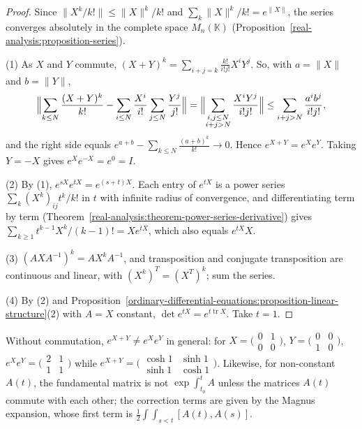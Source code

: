 \begin{proof}
Since $\|X^k/k!\| \leq \|X\|^k/k!$ and $\sum_k\|X\|^k/k! = e^{\|X\|}$, the series converges absolutely in the complete space $M_n(\mathbb{K})$ (Proposition~\ref{real-analysis:proposition-series}).

(1) As $X$ and $Y$ commute, $(X + Y)^k = \sum_{i+j=k}\frac{k!}{i!j!}X^iY^j$. So, with $a = \|X\|$ and $b = \|Y\|$,
\[
\Bigl\|\sum_{k \leq N}\frac{(X + Y)^k}{k!} - \sum_{i \leq N}\frac{X^i}{i!}\sum_{j \leq N}\frac{Y^j}{j!}\Bigr\| = \Bigl\|\sum_{\substack{i, j \leq N\\ i + j > N}}\frac{X^iY^j}{i!j!}\Bigr\|
\leq \sum_{i + j > N}\frac{a^ib^j}{i!j!},
\]
and the right side equals $e^{a+b} - \sum_{k \leq N}\frac{(a + b)^k}{k!} \to 0$. Hence $e^{X+Y} = e^Xe^Y$. Taking $Y = -X$ gives $e^Xe^{-X} = e^0 = I$.

(2) By (1), $e^{sX}e^{tX} = e^{(s+t)X}$. Each entry of $e^{tX}$ is a power series $\sum_k(X^k)_{ij}t^k/k!$ in $t$ with infinite radius of convergence, and differentiating term by term
(Theorem~\ref{real-analysis:theorem-power-series-derivative}) gives $\sum_{k \geq 1}t^{k-1}X^k/(k - 1)! = Xe^{tX}$, which also equals $e^{tX}X$.

(3) $(AXA^{-1})^k = AX^kA^{-1}$, and transposition and conjugate transposition are continuous and linear, with $(X^k)^T = (X^T)^k$; sum the series.

(4) By (2) and Proposition~\ref{ordinary-differential-equations:proposition-linear-structure}(2) with $A = X$ constant, $\det e^{tX} = e^{t\operatorname{tr}X}$. Take $t = 1$.
\end{proof}

\begin{counterexample}\label{ordinary-differential-equations:counterexample-exponential-commute}
Without commutation, $e^{X+Y} \neq e^Xe^Y$ in general: for $X = \bigl(\begin{smallmatrix}0 & 1\\ 0 & 0\end{smallmatrix}\bigr)$, $Y = \bigl(\begin{smallmatrix}0 & 0\\ 1 & 0\end{smallmatrix}\bigr)$, $e^Xe^Y = \bigl(\begin{smallmatrix}2 & 1\\ 1 & 1\end{smallmatrix}\bigr)$
while $e^{X+Y} = \bigl(\begin{smallmatrix}\cosh 1 & \sinh 1\\ \sinh 1 & \cosh 1\end{smallmatrix}\bigr)$. Likewise, for non-constant $A(t)$, the fundamental matrix is not $\exp\int_{t_0}^tA$ unless the matrices $A(t)$ commute with each other; the correction
terms are given by the Magnus expansion, whose first term is $\frac12\int\int_{s < t}[A(t), A(s)]$.
\end{counterexample}

